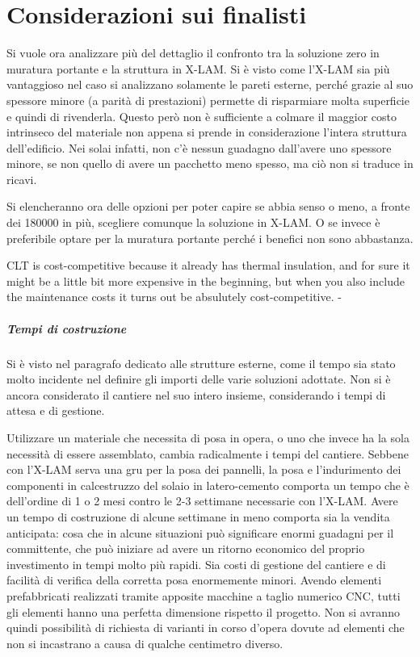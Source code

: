 \chapter{Considerazioni sui finalisti}
Si vuole ora analizzare più del dettaglio il confronto tra la soluzione zero in muratura portante e la struttura in X-LAM. 
Si è visto come l'X-LAM sia più vantaggioso nel caso si analizzano solamente le pareti esterne, perché grazie al suo spessore minore (a parità di prestazioni) permette di risparmiare molta superficie e quindi di rivenderla.
Questo però non è sufficiente a colmare il maggior costo intrinseco del materiale non appena si prende in considerazione l'intera struttura dell'edificio. 
Nei solai infatti, non c'è nessun guadagno dall'avere uno spessore minore, se non quello di avere un pacchetto meno spesso, ma ciò non si traduce in ricavi.

Si elencheranno ora delle opzioni per poter capire se abbia senso o meno, a fronte dei \SI{180000}{\teuro} in più, scegliere comunque la soluzione in X-LAM. 
O se invece è preferibile optare per la muratura portante perché i benefici non sono abbastanza.
\begin{quoting}
    CLT is cost-competitive because it already has thermal insulation, \omissis{} and for sure it might be a little bit more expensive in the beginning, but when you also include the maintenance costs it turns out be absulutely cost-competitive. - \textcite{mallo_outlook_2014}
\end{quoting}    
\paragraph{Tempi di costruzione}
Si è visto nel paragrafo dedicato alle strutture esterne, come il tempo sia stato molto incidente nel definire gli importi delle varie soluzioni adottate.
Non si è ancora considerato il cantiere nel suo intero insieme, considerando i tempi di attesa e di gestione.

Utilizzare un materiale che necessita di posa in opera, o uno che invece ha la sola necessità di essere assemblato, cambia radicalmente i tempi del cantiere.
Sebbene con l'X-LAM serva una gru per la posa dei pannelli, la posa e l'indurimento dei componenti in calcestruzzo del solaio in latero-cemento comporta un tempo che è dell'ordine di 1 o 2 mesi contro le 2-3 settimane necessarie con l'X-LAM. 
Avere un tempo di costruzione di alcune settimane in meno comporta sia la vendita anticipata: cosa che in alcune situazioni può significare enormi guadagni per il committente, che può iniziare ad avere un ritorno economico del proprio investimento in tempi molto più rapidi.
Sia costi di gestione del cantiere e di facilità di verifica della corretta posa enormemente minori. Avendo elementi prefabbricati realizzati tramite apposite macchine a taglio numerico CNC, tutti gli elementi hanno una perfetta dimensione rispetto il progetto. Non si avranno quindi possibilità di richiesta di varianti in corso d'opera dovute ad elementi che non si incastrano a causa di qualche centimetro diverso.

